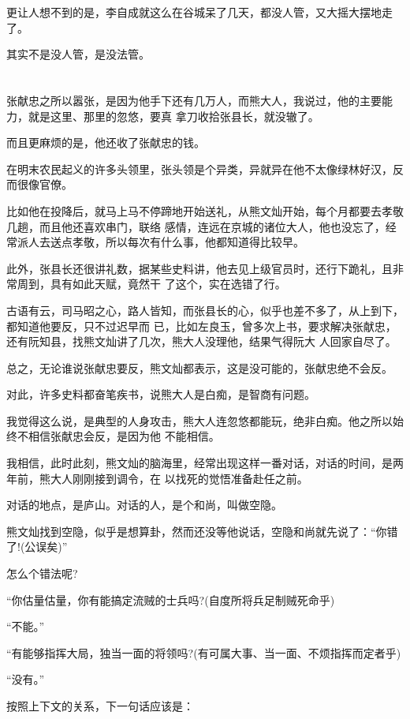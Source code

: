 \documentclass[11pt,a4paper,onecolumn]{article}
\begin{document}
更让人想不到的是，李自成就这么在谷城呆了几天，都没人管，又大摇大摆地走了。

其实不是没人管，是没法管。

\section[\thesection]{}

张献忠之所以嚣张，是因为他手下还有几万人，而熊大人，我说过，他的主要能力，就是这里、那里的忽悠，要真
拿刀收拾张县长，就没辙了。

而且更麻烦的是，他还收了张献忠的钱。

在明末农民起义的许多头领里，张头领是个异类，异就异在他不太像绿林好汉，反而很像官僚。

比如他在投降后，就马上马不停蹄地开始送礼，从熊文灿开始，每个月都要去孝敬几趟，而且他还喜欢串门，联络
感情，连远在京城的诸位大人，他也没忘了，经常派人去送点孝敬，所以每次有什么事，他都知道得比较早。

此外，张县长还很讲礼数，据某些史料讲，他去见上级官员时，还行下跪礼，且非常周到，具有如此天赋，竟然干
了这个，实在选错了行。

古语有云，司马昭之心，路人皆知，而张县长的心，似乎也差不多了，从上到下，都知道他要反，只不过迟早而
已，比如左良玉，曾多次上书，要求解决张献忠，还有阮知县，找熊文灿讲了几次，熊大人没理他，结果气得阮大
人回家自尽了。

总之，无论谁说张献忠要反，熊文灿都表示，这是没可能的，张献忠绝不会反。

对此，许多史料都奋笔疾书，说熊大人是白痴，是智商有问题。

我觉得这么说，是典型的人身攻击，熊大人连忽悠都能玩，绝非白痴。他之所以始终不相信张献忠会反，是因为他
不能相信。

我相信，此时此刻，熊文灿的脑海里，经常出现这样一番对话，对话的时间，是两年前，熊大人刚刚接到调令，在
以找死的觉悟准备赴任之前。

对话的地点，是庐山。对话的人，是个和尚，叫做空隐。

熊文灿找到空隐，似乎是想算卦，然而还没等他说话，空隐和尚就先说了：``你错了!(公误矣)''

怎么个错法呢?

``你估量估量，你有能搞定流贼的士兵吗?(自度所将兵足制贼死命乎)

``不能。''

``有能够指挥大局，独当一面的将领吗?(有可属大事、当一面、不烦指挥而定者乎)

``没有。''

按照上下文的关系，下一句话应该是：
\end{document}
